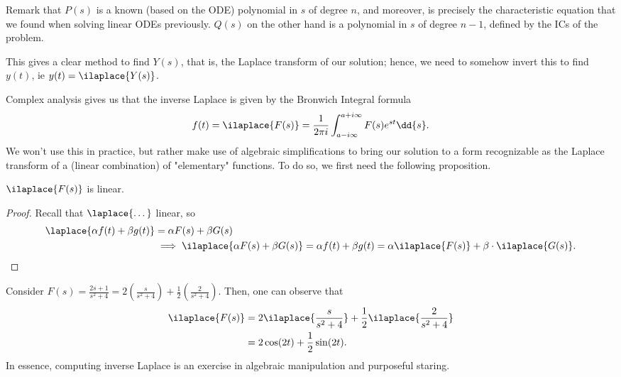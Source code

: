 Remark that $P(s)$ is a known (based on the ODE) polynomial in $s$ of degree $n$, and moreover, is precisely the characteristic equation that we found when solving linear ODEs previously. $Q(s)$ on the other hand is a polynomial in $s$ of degree $n - 1$, defined by the ICs of the problem.

This gives a clear method to find $Y(s)$, that is, the Laplace transform of our solution; hence, we need to somehow invert this to find $y(t)$, ie $y(t) = \ilaplace{Y(s)}$.

Complex analysis gives us that the inverse Laplace is given by the Bronwich Integral formula
\[
f(t) = \ilaplace{F(s)}  = \frac{1}{2\pi i} \int_{a - i \infty}^{a + i \infty} F(s)  e^{st} \dd{s}.
\]
We won't use this in practice, but rather make use of algebraic simplifications to bring our solution to a form recognizable as the Laplace transform of a (linear combination) of "elementary" functions. To do so, we first need the following proposition.

\begin{proposition}
    $\ilaplace{F(s)}$ is linear.
\end{proposition}

\begin{proof}
    Recall that $\laplace{\dots}$ linear, so \begin{align*}
    \laplace{\alpha f(t) + \beta g(t)}     &= \alpha F(s) + \beta G(s) \\
    &\implies \ilaplace{\alpha F(s) + \beta G(s)} = \alpha f(t) + \beta g(t) = \alpha \ilaplace{F(s)} + \beta \cdot \ilaplace{G(s)}.
    \end{align*}
\end{proof}

\begin{example}
    Consider $F(s) = \frac{2s + 1}{s^2+4} = 2(\frac{s}{s^2+4}) + \frac{1}{2}(\frac{2}{s^2 + 4})$. Then, one can observe that \begin{align*}
        \ilaplace{F(s)} &= 2 \ilaplace{\frac{s}{s^2 + 4}} + \frac{1}{2} \ilaplace{\frac{2}{s^2 + 4}}\\
        &= 2 \cos (2t) + \frac{1}{2} \sin(2t).
    \end{align*}
    In essence, computing inverse Laplace is an exercise in algebraic manipulation and purposeful staring.
\end{example}

